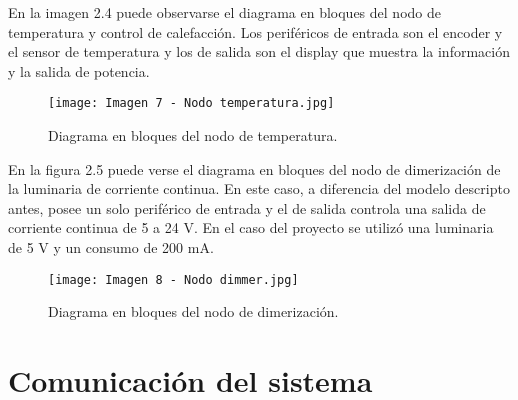 En la imagen 2.4 puede observarse el diagrama en bloques del nodo de temperatura y control de calefacción. Los periféricos de entrada son el encoder y el sensor de temperatura y los de salida son el display que muestra la información y la salida de potencia.

\begin{figure}[h]
\centering
\texttt{[image: Imagen 7 - Nodo temperatura.jpg]}
\caption[Nodo de temperatura]{Diagrama en bloques del nodo de temperatura.}
\label{fig:4}
\end{figure}

En la figura 2.5 puede verse el diagrama en bloques del nodo de dimerización de la luminaria de corriente continua. En este caso, a diferencia del modelo descripto antes, posee un solo periférico de entrada y el de salida controla una salida de corriente continua de 5 a 24 V. En el caso del proyecto se utilizó una luminaria de 5 V y un consumo de 200 mA.

\begin{figure}[h]
\centering
\texttt{[image: Imagen 8 - Nodo dimmer.jpg]}
\caption[Nodo dimer]{Diagrama en bloques del nodo de dimerización.}
\label{fig:4}
\end{figure}

\section{Comunicación del sistema}